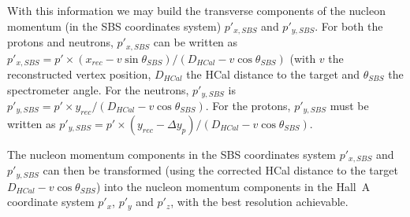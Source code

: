 \documentclass[11pt]{article}
\begin{document}
With this information we may build the transverse components of the nucleon momentum (in the SBS coordinates system) $p'_{x, SBS}$ and $p'_{y, SBS}$.
For both the protons and neutrons, $p'_{x, SBS}$ can be written as $p'_{x, SBS} = p' \times (x_{rec}-v\sin{\theta_{SBS}})/(D_{HCal}-v\cos{\theta_{SBS}})$ (with $v$ the reconstructed vertex position, $D_{HCal}$ the HCal distance to the target and $\theta_{SBS}$ the spectrometer angle.
For the neutrons, $p'_{y, SBS}$ is $p'_{y, SBS} = p' \times y_{rec}/(D_{HCal}-v\cos{\theta_{SBS}})$.
For the protons, $p'_{y, SBS}$ must be written as $p'_{y, SBS} = p' \times (y_{rec} - \Delta y_{p})/(D_{HCal}-v\cos{\theta_{SBS}})$.

The nucleon momentum components in the SBS coordinates system $p'_{x, SBS}$ and $p'_{y, SBS}$ can then be transformed (using the corrected HCal distance to the target $D_{HCal}-v\cos{\theta_{SBS}}$) into the nucleon momentum components in the Hall~A coordinate system $p'_{x}$, $p'_y$ and $p'_z$, with the best resolution achievable. 
\end{document}
